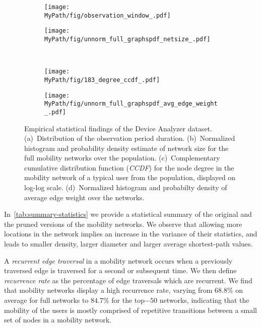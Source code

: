 \begin{figure*}[!t]
	\centering
	\begin{subfigure}[!t]{0.47\textwidth}
		\centering		\texttt{[image: \\MyPath/fig/observation\_window\_.pdf]}
		\caption{}
		\label{fig:num_of_days}
	\end{subfigure}%
	\begin{subfigure}[!t]{.47\textwidth}
		\centering
		\texttt{[image: \\MyPath/fig/unnorm\_full\_graphspdf\_netsize\_.pdf]}
		\caption{}
		\label{fig:sizes}
	\end{subfigure}%
	\\
	\begin{subfigure}[!t]{0.47\textwidth}
		\centering
		\texttt{[image: \\MyPath/fig/183\_degree\_ccdf\_.pdf]}
		\caption{}
		\label{fig:ccdf}
	\end{subfigure}
	\begin{subfigure}[!t]{0.47\textwidth}
		\centering
		\texttt{[image: \\MyPath/fig/unnorm\_full\_graphspdf\_avg\_edge\_weight\_.pdf]}
		\caption{}
		\label{fig:avg_edge_weight}
	\end{subfigure}
	\caption{Empirical statistical findings of the Device Analyzer dataset. (a)~Distribution of the observation period duration. (b)~Normalized histogram and probability density estimate of network size for the full mobility networks over the population. (c)~Complementary cumulative distribution function (\emph{CCDF}) for the node degree in the mobility network of a typical user from the population, displayed on log-log scale. (d)~Normalized histogram and probabilty density of average edge weight over the networks.}
	\label{fig:eda}
\end{figure*}

In~\cref{tab:summary-statistics} we provide a statistical summary of the original and the pruned versions of the mobility networks. We observe that allowing more locations in the network implies an increase in the variance of their statistics, and leads to smaller density, larger diameter and larger average shortest-path values.

A \emph{recurrent edge traversal} in a mobility network occurs when a previously traversed edge is traversed for a second or subsequent time.
We then define \emph{recurrence rate} as the percentage of edge traversals which are recurrent.
We find that mobility networks display a high recurrence rate, varying from  $68.8\%$ on average for full networks to $84.7\% $ for the top$-50$ networks, indicating that the mobility of the users is mostly comprised of repetitive transitions between a small set of nodes in a mobility network.

